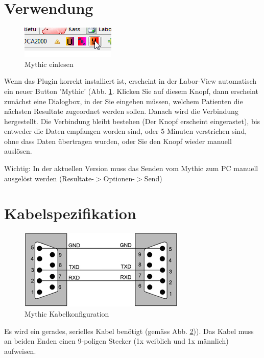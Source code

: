 \documentclass[a4paper]{scrartcl}
\begin{document}
\section{Verwendung}
\begin{figure}[h]
\centering
    \includegraphics{mythic1}
    \caption{Mythic einlesen}
    \label{fig:mythic2}
\end{figure}
Wenn das Plugin korrekt installiert ist, erscheint in der Labor-View automatisch ein neuer Button 'Mythic' (Abb. \ref{fig:mythic2}. Klicken Sie auf diesem Knopf, dann erscheint zunächst eine Dialogbox, in der Sie eingeben müssen, welchem Patienten die nächsten Resultate zugeordnet werden sollen. Danach wird die Verbindung hergestellt. Die Verbindung bleibt bestehen (Der Knopf erscheint eingerastet), bis entweder die Daten empfangen worden sind, oder 5 Minuten verstrichen sind, ohne dass Daten übertragen wurden, oder Sie den Knopf wieder manuell auslösen.

\medskip

Wichtig: In der aktuellen Version muss das Senden vom Mythic zum PC manuell ausgelöst werden (Resultate-$>$Optionen-$>$Send)

\pagebreak

\section{Kabelspezifikation}

\begin{figure}[htbp]
	\centering
		\includegraphics{kabel}
	\caption{Mythic Kabelkonfiguration}
	\label{fig:kabel}
\end{figure}

Es wird ein gerades, serielles Kabel ben\"otigt (gem\"ass Abb. \ref{fig:kabel})). Das Kabel muss an beiden Enden einen 9-poligen Stecker (1x weiblich und 1x m\"annlich) aufweisen.
\end{document}
